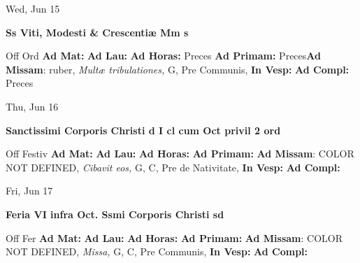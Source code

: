 \documentclass[10pt]{book}
\begin{document}
\begin{center}
\begin{minipage}{3.5in}
\vspace{2em}
\begin{center}Wed, Jun 15
\end{center}
\textbf{ \large Ss Viti, Modesti \& Crescentiæ Mm
\textnormal{\normalsize s}}

\begin{justify}Off Ord
\textbf{Ad Mat: }
\textbf{Ad Lau: }
\textbf{Ad Horas: }Preces
\textbf{Ad Primam: }Preces\textbf{Ad Missam}: ruber, \textit{Multæ tribulationes,} G, Pre Communis, 
\textbf{In Vesp: }
\textbf{Ad Compl: }Preces
\end{justify}
\end{minipage}
\end{center}

\begin{center}
\begin{minipage}{3.5in}
\vspace{2em}
\begin{center}Thu, Jun 16
\end{center}
\textbf{ \large Sanctissimi Corporis Christi
\textnormal{\normalsize d I cl cum Oct privil 2 ord}}

\begin{justify}Off Festiv
\textbf{Ad Mat: }
\textbf{Ad Lau: }
\textbf{Ad Horas: }
\textbf{Ad Primam: }\textbf{Ad Missam}: COLOR NOT DEFINED, \textit{Cibavit eos,} G, C, Pre de Nativitate, 
\textbf{In Vesp: }
\textbf{Ad Compl: }
\end{justify}
\end{minipage}
\end{center}

\begin{center}
\begin{minipage}{3.5in}
\vspace{2em}
\begin{center}Fri, Jun 17
\end{center}
\textbf{ \large Feria VI infra Oct. Ssmi Corporis Christi
\textnormal{\normalsize sd}}

\begin{justify}Off Fer
\textbf{Ad Mat: }
\textbf{Ad Lau: }
\textbf{Ad Horas: }
\textbf{Ad Primam: }\textbf{Ad Missam}: COLOR NOT DEFINED, \textit{Missa,} G, C, Pre Communis, 
\textbf{In Vesp: }
\textbf{Ad Compl: }
\end{justify}
\end{minipage}
\end{center}
\end{document}
